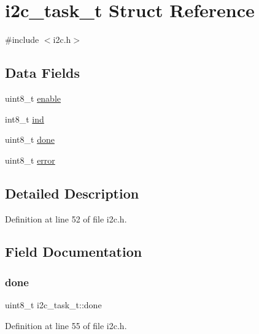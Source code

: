 \hypertarget{structi2c__task__t}{}\section{i2c\+\_\+task\+\_\+t Struct Reference}
\label{structi2c__task__t}


{\ttfamily \#include $<$i2c.\+h$>$}

\subsection*{Data Fields}
\begin{DoxyCompactItemize}
\item 
uint8\+\_\+t \hyperlink{structi2c__task__t_a190ee59e30dfd96f7b88441a5651ce07}{enable}
\item 
int8\+\_\+t \hyperlink{structi2c__task__t_a401fd313653ee49d63a30e766435b4f6}{ind}
\item 
uint8\+\_\+t \hyperlink{structi2c__task__t_a644426e1f2db835f6868b249c1323cf8}{done}
\item 
uint8\+\_\+t \hyperlink{structi2c__task__t_af75c17e49bf863e9aee2e574594028eb}{error}
\end{DoxyCompactItemize}


\subsection{Detailed Description}


Definition at line 52 of file i2c.\+h.



\subsection{Field Documentation}
\mbox{\label{structi2c__task__t_a644426e1f2db835f6868b249c1323cf8}} 
\subsubsection{\texorpdfstring{done}{done}}
{\footnotesize\ttfamily uint8\+\_\+t i2c\+\_\+task\+\_\+t\+::done}



Definition at line 55 of file i2c.\+h.



